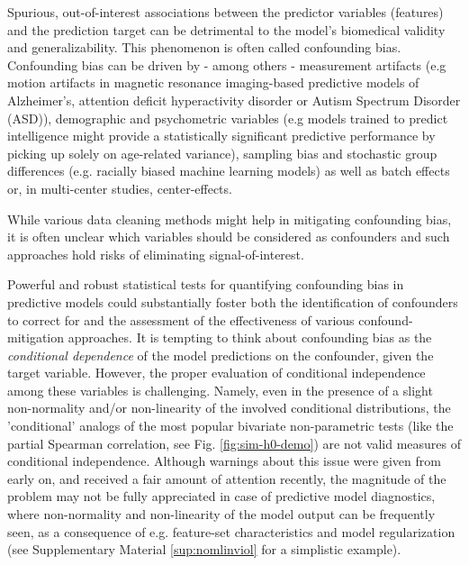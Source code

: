 \documentclass{article}
\begin{document}
Spurious, out-of-interest associations between the predictor variables (features) and the prediction target can be detrimental to the model's biomedical validity and generalizability. This phenomenon is often called confounding bias\citep{prosperi2020causal}. Confounding bias can be driven by - among others - measurement artifacts (e.g motion artifacts in magnetic resonance imaging-based predictive models of Alzheimer's\citep{rao2017predictive}, attention deficit hyperactivity disorder\citep{eloyan2012automated, couvy2016head} or Autism Spectrum Disorder (ASD)\citep{gotts2013perils, spisak2014voxel, spisak2019optimal}), demographic and psychometric variables (e.g models trained to predict intelligence\citep{ cole2012global, he2020deep} might provide a statistically significant predictive performance by picking up solely on age-related variance\citep{dubois2018distributed, lohmann2021predicting}), sampling bias and stochastic group differences (e.g. racially biased machine learning models\citep{ obermeyer2019dissecting, lwowski2021risk}) as well as batch effects or, in multi-center studies, center-effects.

While various data cleaning methods might help in mitigating confounding bias\citep{rao2017predictive, dukart2011age, spisak2014voxel, abdulkadir2014reduction, johnson2007adjusting}, it is often unclear which variables should be considered as confounders and such approaches hold risks of eliminating signal-of-interest\citep{wachinger2021detect}.

Powerful and robust statistical tests for quantifying confounding bias in predictive models could substantially foster both the identification of confounders to correct for and the assessment of the effectiveness of various confound-mitigation approaches. It is tempting to think about confounding bias as the \emph{conditional dependence} of the model predictions on the confounder, given the target variable. However, the proper evaluation of conditional independence among these variables is challenging. Namely, even in the presence of a slight non-normality and/or non-linearity of the involved conditional distributions, the 'conditional' analogs of the most popular bivariate non-parametric tests (like the partial Spearman correlation, see Fig. \ref{fig:sim-h0-demo}) are not valid measures of conditional independence. Although warnings about this issue were given from early on\citep{korn1984ranges}, and received a fair amount of attention recently\citep{bergsma2010nonparametric, candes2016panning, peters2016causal,  shah2020hardness, berrett2020conditional}, the magnitude of the problem may not be fully appreciated in case of predictive model diagnostics, where non-normality and non-linearity of the model output can be frequently seen, as a consequence of e.g. feature-set characteristics and model regularization\citep{garcia2009study, kristensen2017whole} (see Supplementary Material \ref{sup:nomlinviol} for a simplistic example).
\end{document}
